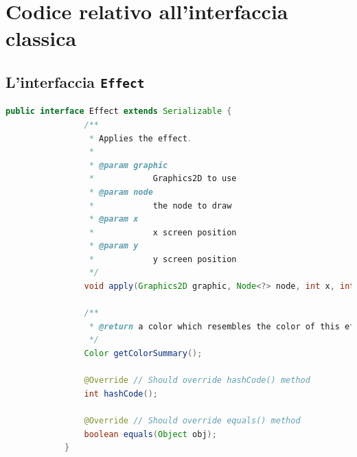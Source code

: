 

\appendix
\chapter{Codice relativo all'interfaccia classica}\label{appendix:old}
    \section{L'interfaccia \texttt{Effect}}\label{appendix:effect}
        \begin{lstlisting}[language=Java]
            public interface Effect extends Serializable {
                /**
                 * Applies the effect.
                 *
                 * @param graphic
                 *            Graphics2D to use
                 * @param node
                 *            the node to draw
                 * @param x
                 *            x screen position
                 * @param y
                 *            y screen position
                 */
                void apply(Graphics2D graphic, Node<?> node, int x, int y);

                /**
                 * @return a color which resembles the color of this effect
                 */
                Color getColorSummary();

                @Override // Should override hashCode() method
                int hashCode();

                @Override // Should override equals() method
                boolean equals(Object obj);
            }
        \end{lstlisting}

